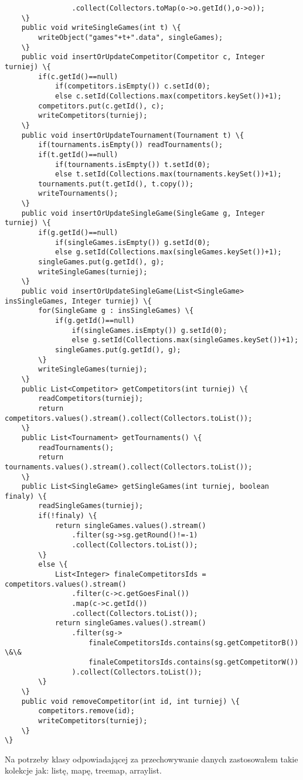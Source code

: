\begin{verbatim}
				.collect(Collectors.toMap(o->o.getId(),o->o));
	\}
	public void writeSingleGames(int t) \{
		writeObject("games"+t+".data", singleGames);
	\}
	public void insertOrUpdateCompetitor(Competitor c, Integer turniej) \{
		if(c.getId()==null) 
			if(competitors.isEmpty()) c.setId(0);
			else c.setId(Collections.max(competitors.keySet())+1);
		competitors.put(c.getId(), c);
		writeCompetitors(turniej);
	\}
	public void insertOrUpdateTournament(Tournament t) \{
		if(tournaments.isEmpty()) readTournaments();
		if(t.getId()==null)
			if(tournaments.isEmpty()) t.setId(0);
			else t.setId(Collections.max(tournaments.keySet())+1);
		tournaments.put(t.getId(), t.copy());
		writeTournaments();
	\}
	public void insertOrUpdateSingleGame(SingleGame g, Integer turniej) \{
		if(g.getId()==null) 
			if(singleGames.isEmpty()) g.setId(0);
			else g.setId(Collections.max(singleGames.keySet())+1);
		singleGames.put(g.getId(), g);
		writeSingleGames(turniej);
	\}
	public void insertOrUpdateSingleGame(List<SingleGame> insSingleGames, Integer turniej) \{
		for(SingleGame g : insSingleGames) \{
			if(g.getId()==null) 
				if(singleGames.isEmpty()) g.setId(0);
				else g.setId(Collections.max(singleGames.keySet())+1);
			singleGames.put(g.getId(), g);
		\}
		writeSingleGames(turniej);
	\}
	public List<Competitor> getCompetitors(int turniej) \{
		readCompetitors(turniej);
		return competitors.values().stream().collect(Collectors.toList());
	\}
	public List<Tournament> getTournaments() \{
		readTournaments();
		return tournaments.values().stream().collect(Collectors.toList());
	\}
	public List<SingleGame> getSingleGames(int turniej, boolean finaly) \{
		readSingleGames(turniej);
		if(!finaly) \{
			return singleGames.values().stream()
				.filter(sg->sg.getRound()!=-1)
				.collect(Collectors.toList());
		\}
		else \{
			List<Integer> finaleCompetitorsIds = competitors.values().stream()
				.filter(c->c.getGoesFinal())
				.map(c->c.getId())
				.collect(Collectors.toList());
			return singleGames.values().stream()
				.filter(sg->
					finaleCompetitorsIds.contains(sg.getCompetitorB()) \&\& 
					finaleCompetitorsIds.contains(sg.getCompetitorW())
				).collect(Collectors.toList());
		\}
	\}
	public void removeCompetitor(int id, int turniej) \{
		competitors.remove(id);
		writeCompetitors(turniej);
	\}
\}
\end{verbatim}
Na potrzeby klasy odpowiadającej za przechowywanie danych zastosowałem takie kolekcje jak: listę, mapę, treemap, arraylist.


